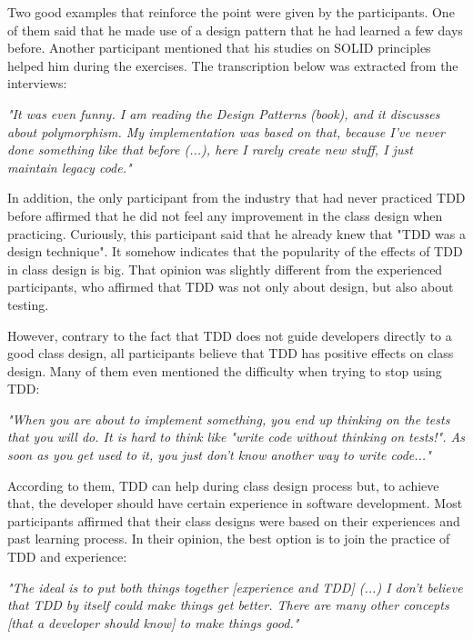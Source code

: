 \documentclass[times]{elsarticle}
\begin{document}
Two good examples that reinforce the point were given by the participants. One of them
said that he made use of a design pattern \cite{gof} that he had learned a few days before. Another
participant mentioned that his studies on SOLID principles helped him during the exercises.
The transcription below was extracted from the interviews:

\begin{framed}
	\textit{"It was even funny. I am reading the Design Patterns (book), and it discusses about polymorphism. 
	My implementation was based on that, because I've never done something like that before (...), here I rarely
	create new stuff, I just maintain legacy code."}
\end{framed}

In addition, the only participant from the industry that had never practiced TDD before
affirmed that he did not feel any improvement in the class design when practicing.
Curiously, this participant said that he already knew that "TDD was a design technique".
It somehow indicates that the popularity of the effects of TDD in class design
is big.
That opinion was slightly different from the experienced participants, 
who affirmed that TDD was not only about design, but also about testing.

However, contrary to the fact that TDD does not guide developers directly to a
good class design, all participants believe that TDD has positive effects on class design.
Many of them even mentioned the difficulty when trying to stop using TDD:

\begin{framed}

	\textit{"When you are about to implement something, you end up thinking on the tests that you will do. 
	It is hard to think like "write code without thinking on tests!". As soon as you get used to it, 
	you just don't know another way to write code..."}
	
\end{framed}

According to them, TDD can help during class design process but, to achieve that,
the developer should have certain experience in software development. Most participants
affirmed that their class designs were based on their experiences and past learning process.
In their opinion, the best option is to join the practice of TDD and experience:

\begin{framed}

	\textit{"The ideal is to put both things together [experience and TDD] (...) 
	I don't believe that TDD by itself could make things get better. There are many other
	concepts [that a developer should know] to make things good."}

\end{framed}
\end{document}
